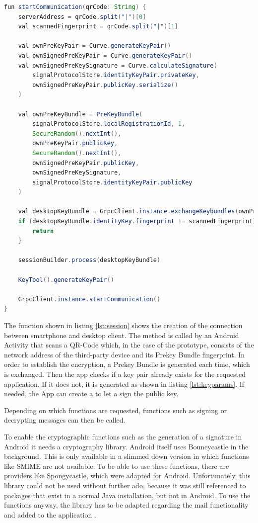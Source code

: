 \documentclass[12pt,oneside,a4paper,parskip]{scrbook}
\begin{document}
\begin{lstlisting}[label=lst:session,
				   language=java,
				   firstnumber=1,
				   caption=Creating a Session]
fun startCommunication(qrCode: String) {
    serverAddress = qrCode.split("|")[0]
    val scannedFingerprint = qrCode.split("|")[1]

    val ownPreKeyPair = Curve.generateKeyPair()
    val ownSignedPreKeyPair = Curve.generateKeyPair()
    val ownSignedPreKeySignature = Curve.calculateSignature(
        signalProtocolStore.identityKeyPair.privateKey,
        ownSignedPreKeyPair.publicKey.serialize()
    )

    val ownPreKeyBundle = PreKeyBundle(
        signalProtocolStore.localRegistrationId, 1,
        SecureRandom().nextInt(),
        ownPreKeyPair.publicKey,
        SecureRandom().nextInt(),
        ownSignedPreKeyPair.publicKey,
        ownSignedPreKeySignature,
        signalProtocolStore.identityKeyPair.publicKey
    )

    val desktopKeyBundle = GrpcClient.instance.exchangeKeybundles(ownPreKeyBundle)
    if (desktopKeyBundle.identityKey.fingerprint != scannedFingerprint) {
        return
    }

    sessionBuilder.process(desktopKeyBundle)

    KeyTool().generateKeyPair()

    GrpcClient.instance.startCommunication()
}
\end{lstlisting}

The function shown in listing \ref{lst:session} shows the creation of the connection between smartphone and desktop client. The method is called by an Android Activity that scans a QR-Code which, in the case of the prototype, consists of the network address of the third-party device and its Prekey Bundle fingerprint. In order to establish the encryption, a Prekey Bundle is generated each time, which is exchanged. Then the app checks if a key pair already exists for the requested application. If it does not, it is generated as shown in listing \ref{lst:keyparams}. If needed, the App can create a  to let a  sign the public key.

Depending on which functions are requested, functions such as signing or decrypting messages can then be called. 

To enable the cryptographic functions such as the generation of a signature in Android it needs a cryptography library. Android itself uses Bouncycastle in the background. This is only available in a slimmed down version in which functions like SMIME are not available. To be able to use these functions, there are providers like Spongycastle, which were adapted for Android. Unfortunately, this library could not be used without further ado, because it was still referenced to packages that exist in a normal Java installation, but not in Android. To use the functions anyway, the library has to be adapted regarding the mail functionality and added to the application \parencite{noauthor_bouncycastle_nodate}.
\end{document}
